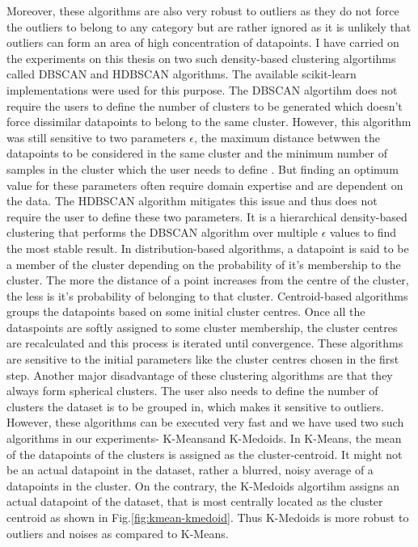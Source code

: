 Moreover, these algorithms are also very robust to outliers as they do not force the outliers to belong to any category but are rather ignored as it is unlikely that outliers can form an area of high concentration of datapoints. I have carried on the experiments on this thesis on two such density-based clustering algortihms called \ac{DBSCAN}\cite*{dbscan} and \ac{HDBSCAN} algorithms\cite*{hdbscan}. The available scikit-learn implementations were used for this purpose\cite*{scikit-learn}. The \ac{DBSCAN}\cite*{dbscan} algortihm  does not require the users to define the number of clusters to be generated which doesn't force dissimilar datapoints to belong to the same cluster. However, this algorithm was still sensitive to two parameters $\epsilon$, the maximum distance betwwen the datapoints to be considered in the same cluster and the minimum number of samples in the cluster which the user needs to define \cite*{scikit-learn}. But finding an optimum value for these parameters often require domain expertise and are dependent on the data. The \ac{HDBSCAN}\cite*{hdbscan} algorithm mitigates this issue and thus does not require the user to define these two parameters. It is a hierarchical density-based clustering that performs the \ac{DBSCAN} algorithm over multiple $\epsilon$ values to find the most stable result. In distribution-based algorithms, a datapoint is said to be a member of the cluster depending on the probability of it's membership to the cluster. The more the distance of a point increases from the centre of the cluster, the less is it's probability of belonging to that cluster. Centroid-based algorithms groups the datapoints based on some initial cluster centres. Once all the dataspoints are softly assigned to some cluster membership, the cluster centres are recalculated and this process is iterated until convergence. These algorithms are sensitive to the initial parameters like the cluster centres chosen in the first step. Another major disadvantage of these clustering algorithms are that they always form spherical clusters. The user also needs to define the number of clusters the dataset is to be grouped in, which makes it sensitive to outliers. However, these algorithms can be executed very fast and we have used two such algorithms in our experiments- K-Means\cite*{kmeans}and K-Medoids\cite*{kmedoids}. In K-Means, the mean of the datapoints of the clusters is assigned as the cluster-centroid. It might not be an actual datapoint in the dataset, rather a blurred, noisy average of a datapoints in the cluster. On the contrary, the K-Medoids algortihm assigns an actual datapoint of the dataset, that is most centrally located as the cluster centroid as shown in Fig.\ref*{fig:kmean-kmedoid}. Thus K-Medoids is more robust to outliers and noises as compared to K-Means.


